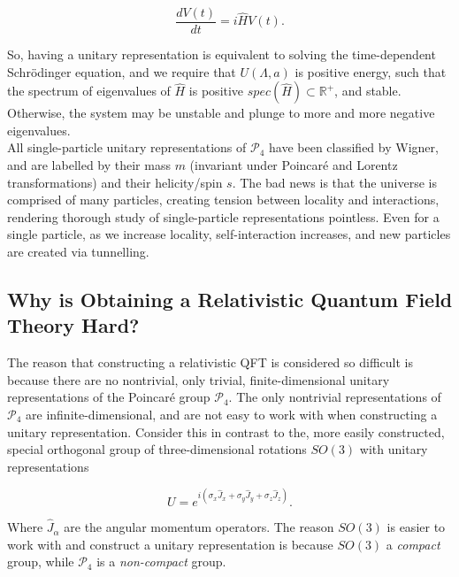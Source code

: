 \begin{equation}
\frac{d V(t)}{dt} = i \hat{H} V(t).
\end{equation}

\noindent So, having a unitary representation is equivalent to solving the time-dependent Schr\"{o}dinger equation, and we require that $U(\Lambda, a)$ is positive energy, such that the spectrum of eigenvalues of $\hat{H}$ is positive $spec(\hat{H}) \subset \mathbb{R}^+$, and stable. Otherwise, the system may be unstable and plunge to more and more negative eigenvalues. \\

\noindent All single-particle unitary representations of $\mathcal{P}_4$ have been classified by Wigner, and are labelled by their mass $m$ (invariant under Poincar\'e and Lorentz transformations) and their helicity/spin $s$. The bad news is that the universe is comprised of many particles, creating tension between locality and interactions, rendering thorough study of single-particle representations pointless. Even for a single particle, as we increase locality, self-interaction increases, and new particles are created via tunnelling. \\

\subsection*{Why is Obtaining a Relativistic Quantum Field Theory Hard?}

\noindent The reason that constructing a relativistic QFT is considered so difficult is because there are no nontrivial, only trivial, finite-dimensional unitary representations of the Poincar\'e group $\mathcal{P}_4$. The only nontrivial representations of $\mathcal{P}_4$ are infinite-dimensional, and are not easy to work with when constructing a unitary representation. Consider this in contrast to the, more easily constructed, special orthogonal group of three-dimensional rotations $SO(3)$ with unitary representations 

\begin{equation}
U = e^{i(\sigma_x \hat{J}_x + \sigma_y \hat{J}_y + \sigma_z \hat{J}_z)}. 
\end{equation}

\noindent Where $\hat{J}_\alpha$ are the angular momentum operators. The reason $SO(3)$ is easier to work with and construct a unitary representation is because $SO(3)$ a \textit{compact} group, while $\mathcal{P}_4$ is a \textit{non-compact} group.